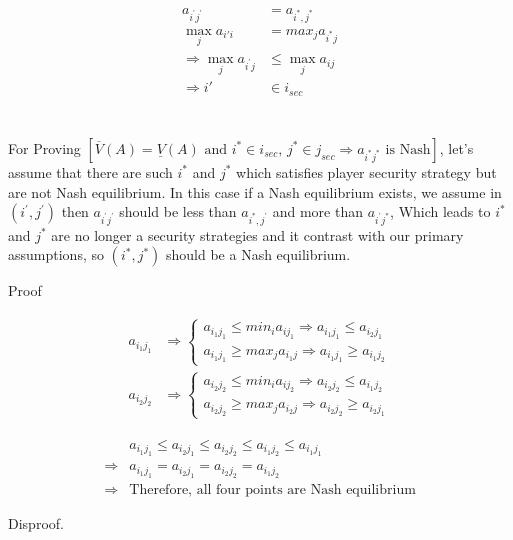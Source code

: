 \documentclass[
  course = {{IE579 Game Theory and Multi-Agent Reinforcement Learning}},
  assignment = 1,
  name = {{Mohammad Mahdi Rahimi}},
  studentnumber = {{20208244}},
  email = {{mahi@kaist.ac.kr}},
  firstexercise = 1
]{aga-homework}
\begin{document}
\begin{equation}
    \begin{split}
        a_{i^\prime j^\prime} & = a_{i^*, j^*} \\
        \max_j{a_{i\prime i}} & = max_j{a_{i^* j}}\\
        \Rightarrow \max_j{a_{i^\prime j}} & \le \max_j{a_{ij}}\\
        \Rightarrow i\prime & \in i_{sec}
    \end{split}
\end{equation}
\\
\\
For Proving $[\overline{V}(A) = \underline{V}(A)\text{ and  } i^* \in i_{sec}\text{, } j^* \in j_{sec} \Rightarrow a_{i^* j^* }\text{ is Nash}]$, let's assume that there are such $i^*$ and $j^*$ which satisfies player security strategy but are not Nash equilibrium. In this case if a Nash equilibrium exists, we assume in $(i^\prime, j^\prime)$ then $a_{i^\prime j^\prime}$ should be less than $a_{i^*, j^\prime}$ and more than $a_{i^\prime j^*}$, Which leads to $i^*$ and $j^*$ are no longer a security strategies and it contrast with our primary assumptions, so $(i^*, j^*)$ should be a Nash equilibrium.

\subexercise Proof

\begin{equation}
    \begin{split}
        a_{i_1j_1} & \Rightarrow \begin{cases}
        a_{i_1j_1} \le min_i{a_{ij_1}} \Rightarrow a_{i_1j_1} \le a_{i_2j_1}\\
        a_{i_1j_1} \ge max_j{a_{i_1j}} \Rightarrow a_{i_1j_1} \ge a_{i_1j_2}
        \end{cases}\\
        a_{i_2j_2} & \Rightarrow \begin{cases}
        a_{i_2j_2} \le min_i{a_{ij_2}} \Rightarrow a_{i_2j_2} \le a_{i_1j_2}\\
        a_{i_2j_2} \ge max_j{a_{i_2j}} \Rightarrow a_{i_2j_2} \ge a_{i_2j_1}
        \end{cases}
    \end{split}
\end{equation}

\begin{equation}
    \begin{split}
         & a_{i_1j_1} \le  a_{i_2j_1} \le  a_{i_2j_2} \le  a_{i_1j_2} \le  a_{i_1j_1}\\
         \Rightarrow & a_{i_1j_1} =  a_{i_2j_1} =  a_{i_2j_2} =  a_{i_1j_2}\\
         \Rightarrow & \text{Therefore, all four points are Nash equilibrium}
    \end{split}
\end{equation}

\newpage
\exercise

\subexercise Disproof. 
\end{document}
